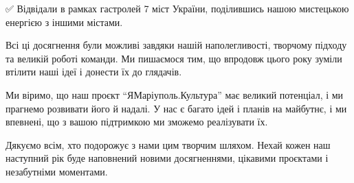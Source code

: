 ✅ Відвідали в рамках гастролей 7 міст України, поділившись нашою мистецькою
енергією з іншими містами.

Всі ці досягнення були можливі завдяки нашій наполегливості, творчому підходу
та великій роботі команди. Ми пишаємося тим, що впродовж цього року зуміли
втілити наші ідеї і донести їх до глядачів.

Ми віримо, що наш проєкт \enquote{ЯМаріуполь.Культура} має великий потенціал, і ми
прагнемо розвивати його й надалі. У нас є багато ідей і планів на майбутнє, і
ми впевнені, що з вашою підтримкою ми зможемо реалізувати їх.

Дякуємо всім, хто подорожує з нами цим творчим шляхом. Нехай кожен наш
наступний рік буде наповнений новими досягненнями, цікавими проєктами і
незабутніми моментами.
